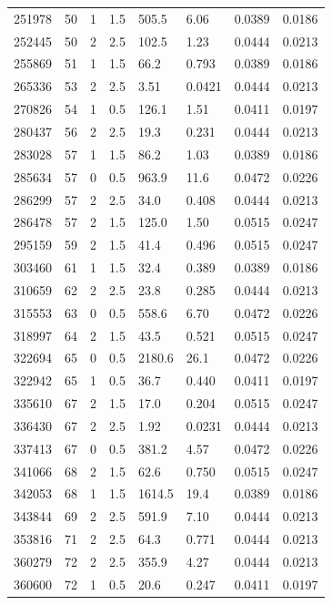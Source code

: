\documentclass[preview]{standalone}
\begin{document}
{{{\begin{tabular}{L{1.2cm}C{1.2cm} C{0.3cm}C{0.5cm} C{1.4cm}C{1.4cm} C{1.4cm}C{1.4cm}}
  251978  &    50  & 1     & 1.5 &  505.5  & 6.06  & 0.0389 &  0.0186   \\ 
  252445  &    50  & 2     & 2.5 &  102.5  & 1.23  & 0.0444 &  0.0213   \\ 
  255869  &    51  & 1     & 1.5 &  66.2  & 0.793  & 0.0389 &  0.0186   \\ 
  265336  &    53  & 2     & 2.5 &  3.51  & 0.0421  & 0.0444 &  0.0213   \\ 
  270826  &    54  & 1     & 0.5 &  126.1  & 1.51  & 0.0411 &  0.0197   \\ 
  280437  &    56  & 2     & 2.5 &  19.3  & 0.231  & 0.0444 &  0.0213   \\ 
  283028  &    57  & 1     & 1.5 &  86.2  & 1.03  & 0.0389 &  0.0186   \\ 
  285634  &    57  & 0     & 0.5 &  963.9  & 11.6  & 0.0472 &  0.0226   \\ 
  286299  &    57  & 2     & 2.5 &  34.0  & 0.408  & 0.0444 &  0.0213   \\ 
  286478  &    57  & 2     & 1.5 &  125.0  & 1.50  & 0.0515 &  0.0247   \\ 
  295159  &    59  & 2     & 1.5 &  41.4  & 0.496  & 0.0515 &  0.0247   \\ 
  303460  &    61  & 1     & 1.5 &  32.4  & 0.389  & 0.0389 &  0.0186   \\ 
  310659  &    62  & 2     & 2.5 &  23.8  & 0.285  & 0.0444 &  0.0213   \\ 
  315553  &    63  & 0     & 0.5 &  558.6  & 6.70  & 0.0472 &  0.0226   \\ 
  318997  &    64  & 2     & 1.5 &  43.5  & 0.521  & 0.0515 &  0.0247   \\ 
  322694  &    65  & 0     & 0.5 &  2180.6  & 26.1  & 0.0472 &  0.0226   \\ 
  322942  &    65  & 1     & 0.5 &  36.7  & 0.440  & 0.0411 &  0.0197   \\ 
  335610  &    67  & 2     & 1.5 &  17.0  & 0.204  & 0.0515 &  0.0247   \\ 
  336430  &    67  & 2     & 2.5 &  1.92  & 0.0231  & 0.0444 &  0.0213   \\ 
  337413  &    67  & 0     & 0.5 &  381.2  & 4.57  & 0.0472 &  0.0226   \\ 
  341066  &    68  & 2     & 1.5 &  62.6  & 0.750  & 0.0515 &  0.0247   \\ 
  342053  &    68  & 1     & 1.5 &  1614.5  & 19.4  & 0.0389 &  0.0186   \\ 
  343844  &    69  & 2     & 2.5 &  591.9  & 7.10  & 0.0444 &  0.0213   \\ 
  353816  &    71  & 2     & 2.5 &  64.3  & 0.771  & 0.0444 &  0.0213   \\ 
  360279  &    72  & 2     & 2.5 &  355.9  & 4.27  & 0.0444 &  0.0213   \\ 
  360600  &    72  & 1     & 0.5 &  20.6  & 0.247  & 0.0411 &  0.0197   \\ 
\hline 
\end{tabular} 

}}}
\end{document}

